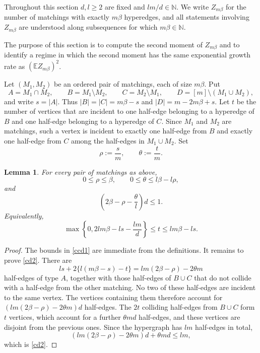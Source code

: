 \documentclass[11pt]{amsart}
\theoremstyle{plain}
\newtheorem{lemma}[theorem]{Lemma}
\numberwithin{equation}{section}
\numberwithin{theorem}{section}
\numberwithin{figure}{section}
\begin{document}
Throughout this section $d,l\geq 2$ are fixed and $lm/d\in\mathbb N$.  We write
$Z_{m\beta}$ for the number of matchings with exactly $m\beta$ hyperedges, and all
statements involving $Z_{m\beta}$ are understood along subsequences for which
$m\beta\in\mathbb N$.

The purpose of this section is to compute the second moment of $Z_{m\beta}$ and to
identify a regime in which the second moment has the same exponential growth rate as
$(\mathbb E Z_{m\beta})^2$.

Let $(M_1,M_2)$ be an ordered pair of matchings, each of size $m\beta$.  Put
\[
A=M_1\cap M_2,
\qquad B=M_1\setminus M_2,
\qquad C=M_2\setminus M_1,
\qquad D=[m]\setminus(M_1\cup M_2),
\]
and write $s=|A|$.  Thus $|B|=|C|=m\beta-s$ and
$|D|=m-2m\beta+s$.  Let $t$ be the number of vertices that are incident to one
half-edge belonging to a hyperedge of $B$ and one half-edge belonging to a hyperedge of
$C$.  Since $M_1$ and $M_2$ are matchings, such a vertex is incident to exactly one
half-edge from $B$ and exactly one half-edge from $C$ among the half-edges in
$M_1\cup M_2$.  Set
\begin{equation}
\rho:=\frac{s}{m},\qquad \theta:=\frac{t}{m}.\label{drt}
\end{equation}

\begin{lemma}\label{lem:second-feasible}
For every pair of matchings as above,
\begin{equation}
0\leq \rho\leq \beta,\qquad 0\leq \theta\leq l\beta-l\rho,\label{ccd1}
\end{equation}
and
\begin{equation}
\left(2\beta-\rho-\frac{\theta}{l}\right)d\leq 1.\label{cd2}
\end{equation}
Equivalently,
\begin{equation*}
\max\left\{0,2lm\beta-ls-\frac{lm}{d}\right\}\leq t\leq lm\beta-ls .
\end{equation*}
\end{lemma}

\begin{proof}
The bounds in \eqref{ccd1} are immediate from the definitions.  It remains to prove
\eqref{cd2}.  There are
\[
ls+2\{l(m\beta-s)-t\}=lm(2\beta-\rho)-2\theta m
\]
half-edges of type $A$, together with those half-edges of $B\cup C$ that do not collide
with a half-edge from the other matching.  No two of these half-edges are incident to the
same vertex.  The vertices containing them therefore account for
$(lm(2\beta-\rho)-2\theta m)d$ half-edges.  The $2t$ colliding half-edges from
$B\cup C$ form $t$ vertices, which account for a further $\theta md$ half-edges, and
these vertices are disjoint from the previous ones.  Since the hypergraph has $lm$
half-edges in total,
\[
(lm(2\beta-\rho)-2\theta m)d+\theta md\leq lm,
\]
which is \eqref{cd2}.
\end{proof}
\end{document}
